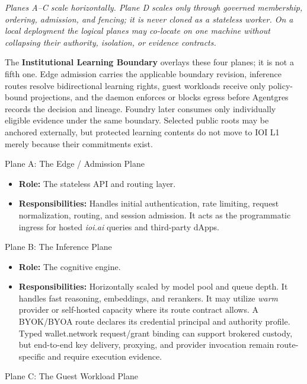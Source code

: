 \documentclass[
  11pt,
]{article}
\providecommand{\tightlist}{%
  \setlength{\itemsep}{0pt}\setlength{\parskip}{0pt}}
\begin{document}
\emph{Planes A--C scale horizontally. Plane D scales only through governed
membership, ordering, admission, and fencing; it is never cloned as a
stateless worker. On a local deployment the logical planes may co-locate on one
machine without collapsing their authority, isolation, or evidence contracts.}

The \textbf{Institutional Learning Boundary} overlays these four planes; it is
not a fifth one. Edge admission carries the applicable boundary revision,
inference routes resolve bidirectional learning rights, guest workloads receive
only policy-bound projections, and the daemon enforces or blocks egress before
Agentgres records the decision and lineage. Foundry later consumes only
individually eligible evidence under the same boundary. Selected public roots
may be anchored externally, but protected learning contents do not move to IOI
L1 merely because their commitments exist.

Plane A: The Edge / Admission Plane

\begin{itemize}
\tightlist
\item
  \textbf{Role:} The stateless API and routing layer.
\item
  \textbf{Responsibilities:} Handles initial authentication, rate
  limiting, request normalization, routing, and session admission. It
  acts as the programmatic ingress for hosted \emph{ioi.ai} queries and
  third-party dApps.
\end{itemize}

Plane B: The Inference Plane

\begin{itemize}
\tightlist
\item
  \textbf{Role:} The cognitive engine.
\item
  \textbf{Responsibilities:} Horizontally scaled by model pool and queue
  depth. It handles fast reasoning, embeddings, and rerankers. It
  may utilize \emph{warm} provider or self-hosted capacity where its route
  contract allows. A BYOK/BYOA route declares its credential principal and
  authority profile. Typed wallet.network request/grant binding can support
  brokered custody, but end-to-end key delivery, proxying, and provider
  invocation remain route-specific and require execution evidence.
\end{itemize}

Plane C: The Guest Workload Plane
\end{document}
